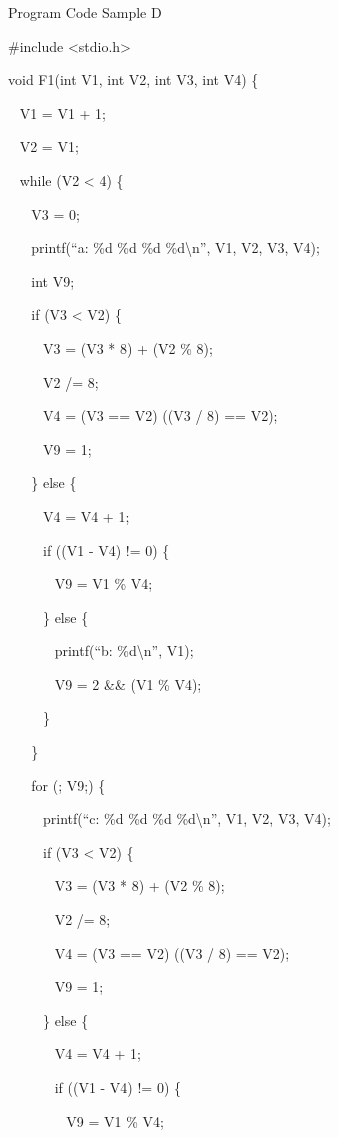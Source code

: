 \documentclass[]{article}
\begin{document}
{}

{Program Code Sample D}

{}

{\#include \textless{}stdio.h\textgreater{}}

{}

{void F1(int V1, int V2, int V3, int V4) \{}

{~ V1 = V1 + 1;}

{~ V2 = V1;}

{~ while (V2 \textless{} 4) \{}

{~ ~ V3 = 0;}

{}

{~ ~ printf(``a: \%d \%d \%d \%d\textbackslash{}n'', V1, V2, V3, V4);}

{~ ~ int V9;}

{~ ~ if (V3 \textless{} V2) \{}

{~ ~ ~ V3 = (V3 * 8) + (V2 \% 8);}

{~ ~ ~ V2 /= 8;}

{~ ~ ~ V4 = (V3 == V2) \textbar{} ((V3 / 8) == V2);}

{~ ~ ~ V9 = 1;}

{~ ~ \} else \{}

{~ ~ ~ V4 = V4 + 1;}

{~ ~ ~ if ((V1 - V4) != 0) \{}

{~ ~ ~ ~ V9 = V1 \% V4;}

{~ ~ ~ \} else \{}

{~ ~ ~ ~ printf(``b: \%d\textbackslash{}n'', V1);}

{~ ~ ~ ~ V9 = 2 \&\& (V1 \% V4);}

{~ ~ ~ \}}

{~ ~ \}}

{}

{~ ~ for (; V9;) \{}

{~ ~ ~ printf(``c: \%d \%d \%d \%d\textbackslash{}n'', V1, V2, V3, V4);}

{~ ~ ~ if (V3 \textless{} V2) \{}

{~ ~ ~ ~ V3 = (V3 * 8) + (V2 \% 8);}

{~ ~ ~ ~ V2 /= 8;}

{~ ~ ~ ~ V4 = (V3 == V2) \textbar{} ((V3 / 8) == V2);}

{~ ~ ~ ~ V9 = 1;}

{~ ~ ~ \} else \{}

{~ ~ ~ ~ V4 = V4 + 1;}

{~ ~ ~ ~ if ((V1 - V4) != 0) \{}

{~ ~ ~ ~ ~ V9 = V1 \% V4;}
\end{document}
